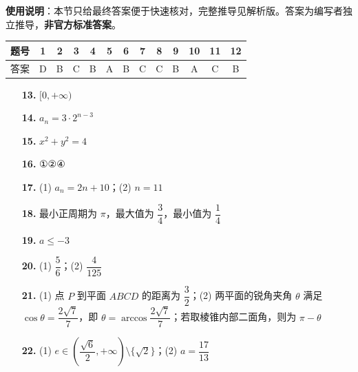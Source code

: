 
\begin{gknotice}
\textbf{使用说明}：本节只给最终答案便于快速核对，完整推导见解析版。答案为编写者独立推导，\textbf{非官方标准答案}。
\end{gknotice}

\begin{center}\begin{tabular}{ccccccccccccc}
\toprule
题号 & 1 & 2 & 3 & 4 & 5 & 6 & 7 & 8 & 9 & 10 & 11 & 12 \\
\midrule
答案 & D & B & C & B & A & B & C & C & B & A & C & B \\
\bottomrule
\end{tabular}\end{center}

\begin{itemize}[leftmargin=2.6em]
  \item[\textbf{13.}] $[0,+\infty)$
  \item[\textbf{14.}] $a_n=3\cdot2^{n-3}$
  \item[\textbf{15.}] $x^2+y^2=4$
  \item[\textbf{16.}] ①②④
\end{itemize}

\begin{itemize}[leftmargin=2.6em]
  \item[\textbf{17.}] (1) $a_n=2n+10$；(2) $n=11$
  \item[\textbf{18.}] 最小正周期为 $\pi$，最大值为 $\dfrac34$，最小值为 $\dfrac14$
  \item[\textbf{19.}] $a\leqslant-3$
  \item[\textbf{20.}] (1) $\dfrac56$；(2) $\dfrac4{125}$
  \item[\textbf{21.}] (1) 点 $P$ 到平面 $ABCD$ 的距离为 $\dfrac32$；(2) 两平面的锐角夹角 $\theta$ 满足 $\cos\theta=\dfrac{2\sqrt7}{7}$，即 $\theta=\arccos\dfrac{2\sqrt7}{7}$；若取棱锥内部二面角，则为 $\pi-\theta$
  \item[\textbf{22.}] (1) $e\in\left(\dfrac{\sqrt6}{2},+\infty\right)\setminus\{\sqrt2\}$；(2) $a=\dfrac{17}{13}$
\end{itemize}
